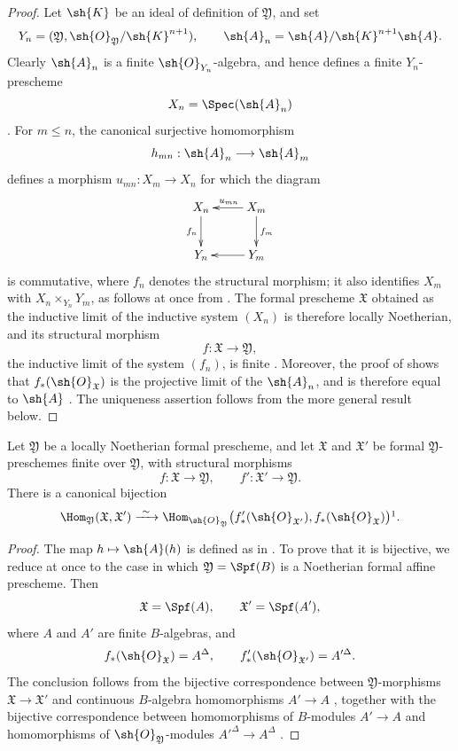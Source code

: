 \begin{proof}
Let $\sh{K}$ be an ideal of definition of $\mathfrak{Y}$, and set
\[
  Y_n=(\mathfrak{Y},
       \sh{O}_{\mathfrak{Y}}/\sh{K}^{n+1}),
  \qquad
  \sh{A}_n=\sh{A}/\sh{K}^{n+1}\sh{A}.
\]
Clearly $\sh{A}_n$ is a finite $\sh{O}_{Y_n}$-algebra, and hence
defines a finite $Y_n$-prescheme
\[
  X_n=\Spec(\sh{A}_n)
\]
.  For $m\leq n$, the canonical surjective
homomorphism
\[
  h_{mn}:\sh{A}_n\longrightarrow\sh{A}_m
\]
defines a morphism $u_{mn}:X_m\to X_n$ for which the diagram
\[
  \xymatrix{
    X_n\ar[d]_{f_n} &
    X_m\ar[l]_{u_{mn}}\ar[d]^{f_m}\\
    Y_n &
    Y_m\ar[l]
  }
\]
is commutative, where $f_n$ denotes the structural morphism; it
also identifies $X_m$ with
$X_n\times_{Y_n}Y_m$, as follows at once from
.  The formal prescheme $\mathfrak{X}$ obtained
as the inductive limit of the inductive system $(X_n)$ is therefore
locally Noetherian, and its structural morphism
\[
  f:\mathfrak{X}\longrightarrow\mathfrak{Y},
\]
the inductive limit of the system $(f_n)$, is finite
 .  Moreover, the proof of
 shows that
$f_*(\sh{O}_{\mathfrak{X}})$ is the projective limit of the
$\sh{A}_n$, and is therefore equal to $\sh{A}$
.  The uniqueness assertion follows from the
more general result below.
\end{proof}

\begin{proposition}[4.8.8]
\label{III.4.8.8}
Let $\mathfrak{Y}$ be a locally Noetherian formal prescheme, and
let $\mathfrak{X}$ and $\mathfrak{X}'$ be formal
$\mathfrak{Y}$-preschemes finite over $\mathfrak{Y}$, with
structural morphisms
\[
  f:\mathfrak{X}\to\mathfrak{Y},\qquad
  f':\mathfrak{X}'\to\mathfrak{Y}.
\]
There is a canonical bijection
\[
  \Hom_{\mathfrak{Y}}(\mathfrak{X},\mathfrak{X}')
  \xrightarrow{\ \sim\ }
  \Hom_{\sh{O}_{\mathfrak{Y}}}
  \bigl(f'_*(\sh{O}_{\mathfrak{X}'}),
        f_*(\sh{O}_{\mathfrak{X}})\bigr)\footnotemark.
\]
\end{proposition}

\begin{proof}
The map $h\mapsto\sh{A}(h)$ is defined as in
.  To prove that it is bijective, we reduce at
once to the case in which
$\mathfrak{Y}=\Spf(B)$ is a Noetherian formal affine prescheme.
Then
\[
  \mathfrak{X}=\Spf(A),\qquad
  \mathfrak{X}'=\Spf(A'),
\]
where $A$ and $A'$ are finite $B$-algebras, and
\[
  f_*(\sh{O}_{\mathfrak{X}})=A^\Delta,\qquad
  f'_*(\sh{O}_{\mathfrak{X}'})=A'^\Delta.
\]
The conclusion follows from the bijective correspondence between
$\mathfrak{Y}$-morphisms
$\mathfrak{X}\to\mathfrak{X}'$ and continuous $B$-algebra
homomorphisms $A'\to A$ , together with the
bijective correspondence between homomorphisms of $B$-modules
$A'\to A$ and homomorphisms of
$\sh{O}_{\mathfrak{Y}}$-modules
$A'^\Delta\to A^\Delta$ .
\end{proof}

